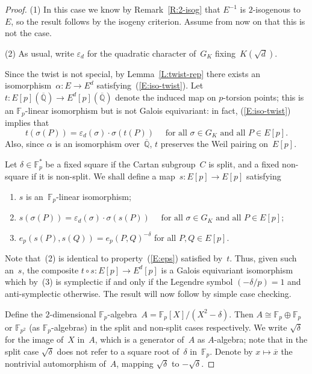 \documentclass[12pt, reqno]{amsart}
\newcommand{\F}{\mathbb{F}}
\newcommand{\Q}{\mathbb{Q}}
\newcommand{\Qbar}{{\overline{\Q}}}
\newcommand{\eps}{\varepsilon}
\numberwithin{equation}{section}
\theoremstyle{definition}
\theoremstyle{remark}
\begin{document}
\begin{proof}
(1) In this case we know by Remark~\ref{R:2-isog} that $E^{-1}$ is
  $2$-isogenous to~$E$, so the result follows by the isogeny
  criterion.  Assume from now on that this is not the case.

(2) As usual, write $\eps_d$ for the quadratic character of~$G_K$
fixing~$K(\sqrt{d})$.

Since the twist is not special, by Lemma~\ref{L:twist-rep} there
exists an isomorphism~$\alpha: E \to E^d$
satisfying~(\ref{E:iso-twist}).  Let $t: E[p](\Qbar) \to
E^d[p](\Qbar)$ denote the induced map on $p$-torsion points; this is
an $\F_p$-linear isomorphism but is not Galois equivariant: in fact,
(\ref{E:iso-twist}) implies that
\begin{equation} \label{E:eps}
 t(\sigma(P)) = \eps_d(\sigma)\cdot\sigma(t(P)) \quad \text{ for all } \sigma \in G_K
 \text{ and all } P \in E[p].
\end{equation}
Also, since $\alpha$ is an isomorphism
over~$\Qbar$, $t$ preserves the Weil pairing on~$E[p]$.

Let $\delta\in\F_p^*$ be a fixed square if the Cartan subgroup~$C$ is
split, and a fixed non-square if it is non-split.  We shall define a
map~$s:E[p]\to E[p]$ satisfying
\begin{enumerate}
  \item $s$ is an~$\F_p$-linear isomorphism;
  \item  $s(\sigma(P)) = \eps_d(\sigma)\cdot\sigma(s(P)) \quad \text{ for all } \sigma \in G_K
    \text{ and all } P \in E[p]$; 
  \item $e_p(s(P),s(Q)) = e_p(P,Q)^{-\delta}$ for all $P,Q\in E[p]$.
\end{enumerate}
Note that~(2) is identical to property~(\ref{E:eps}) satisfied
by~$t$. Thus, given such an~$s$, the composite $t\circ s:E[p]\to
E^d[p]$ is a Galois equivariant isomorphism which by~(3) is symplectic
if and only if the Legendre symbol $(-\delta/p) = 1$ and
anti-symplectic otherwise. The result will now follow by simple case
checking.

\def\rd{\sqrt{\delta}} Define the $2$-dimensional
$\F_p$-algebra~$A=\F_p[X]/(X^2-\delta)$.  Then $A\cong\F_p\oplus\F_p$
or $\F_{p^2}$ (as $\F_p$-algebras) in the split and non-split cases
respectively.  We write $\sqrt{\delta}$ for the image of~$X$ in~$A$,
which is a generator of~$A$ as $A$-algebra; note that in the split
case $\rd$ does not refer to a square root of~$\delta$ in~$\F_p$.
Denote by $x\mapsto\overline{x}$ the nontrivial automorphism of~$A$,
mapping $\rd$ to $-\rd$.


\end{proof}
\end{document}
